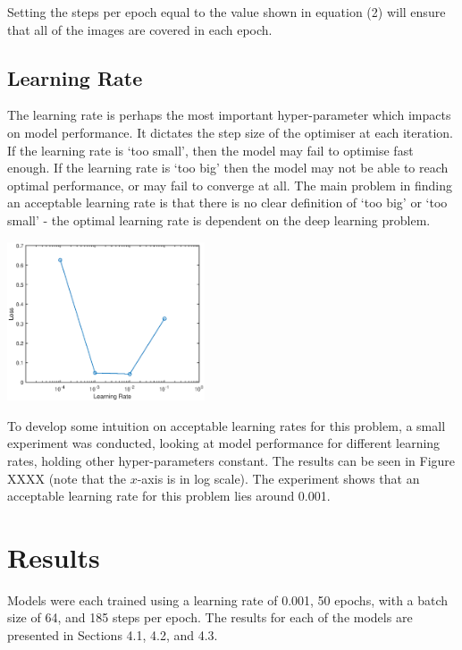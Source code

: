 \documentclass[a4paper]{article}
\begin{document}
Setting the steps per epoch equal to the value shown in equation (2) will ensure that all of the images are covered in each epoch.

\subsection{Learning Rate}
\begin{minipage}{0.45\textwidth}
The learning rate is perhaps the most important hyper-parameter which impacts on model performance. It dictates the step size of the optimiser at each iteration. If the learning rate is `too small', then the model may fail to optimise fast enough. If the learning rate is `too big' then the model may not be able to reach optimal performance, or may fail to converge at all. The main problem in finding an acceptable learning rate is that there is no clear definition of `too big' or `too small' - the optimal learning rate is dependent on the deep learning problem.
\end{minipage}
\hspace{1cm}
\begin{minipage}{0.45\textwidth}
\centering
\includegraphics[height=4.7cm]{hyp_par_3}
\end{minipage}

\vspace{0.2cm}

To develop some intuition on acceptable learning rates for this problem, a small experiment was conducted, looking at model performance for different learning rates, holding other hyper-parameters constant. The results can be seen in Figure XXXX (note that the $x$-axis is in log scale). The experiment shows that an acceptable learning rate for this problem lies around 0.001.

\section{Results}
Models were each trained using a learning rate of 0.001, 50 epochs, with a batch size of 64, and 185 steps per epoch. The results for each of the models are presented in Sections 4.1, 4.2, and 4.3.
\end{document}

